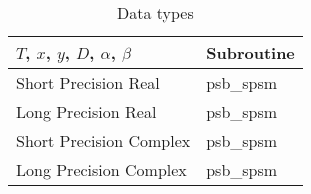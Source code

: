 
\begin{table}[h]
\begin{center}
\begin{tabular}{ll}
\hline
$T$, $x$, $y$, $D$, $\alpha$, $\beta$ & {\bf Subroutine}\\
\hline
Short Precision Real & psb\_spsm \\
Long Precision Real & psb\_spsm \\
Short Precision Complex & psb\_spsm \\
Long Precision Complex & psb\_spsm \\
\hline
\end{tabular}
\end{center}
\caption{Data types\label{tab:f90spsm}}
\end{table}



